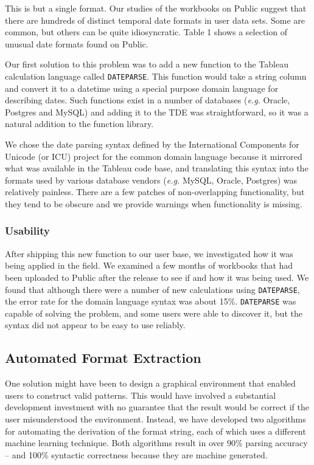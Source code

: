 This is but a single format. Our studies of the workbooks on Public suggest that there are hundreds of distinct temporal date formats in user data sets. Some are common, but others can be quite idiosyncratic. Table 1 shows a selection of unusual date formats found on Public.


Our first solution to this problem was to add a new function to the Tableau calculation language called \texttt{DATEPARSE}. This function would take a string column and convert it to a datetime using a special purpose domain language for describing dates. Such functions exist in a number of databases (\textit{e.g.} Oracle, Postgres and MySQL) and adding it to the TDE was straightforward, so it was a natural addition to the function library.

We chose the date parsing syntax defined by the International Components for Unicode (or ICU) project \cite{icu} for the common domain language because it mirrored what was available in the Tableau code base, and translating this syntax into the formats used by various database vendors (\textit{e.g.} MySQL, Oracle, Postgres) was relatively painless. There are a few patches of non-overlapping functionality, but they tend to be obscure and we provide warnings when functionality is missing.

\subsubsection{	Usability}
After shipping this new function to our user base, we investigated how it was being applied in the field. We examined a few months of workbooks that had been uploaded to Public after the release to see if and how it was being used. We found that although there were a number of new calculations using \texttt{DATEPARSE}, the error rate for the domain language syntax was about 15\%. \texttt{DATEPARSE} was capable of solving the problem, and some users were able to discover it, but the syntax did not appear to be easy to use reliably.

\subsection{Automated Format Extraction}
One solution might have been to design a graphical environment that enabled users to construct valid patterns. This would have involved a substantial development investment with no guarantee that the result would be correct if the user misunderstood the environment. Instead, we have developed two algorithms for automating the derivation of the format string, each of which uses a different machine learning technique. Both algorithms result in over 90\% parsing accuracy -- and 100\% syntactic correctness because they are machine generated.

